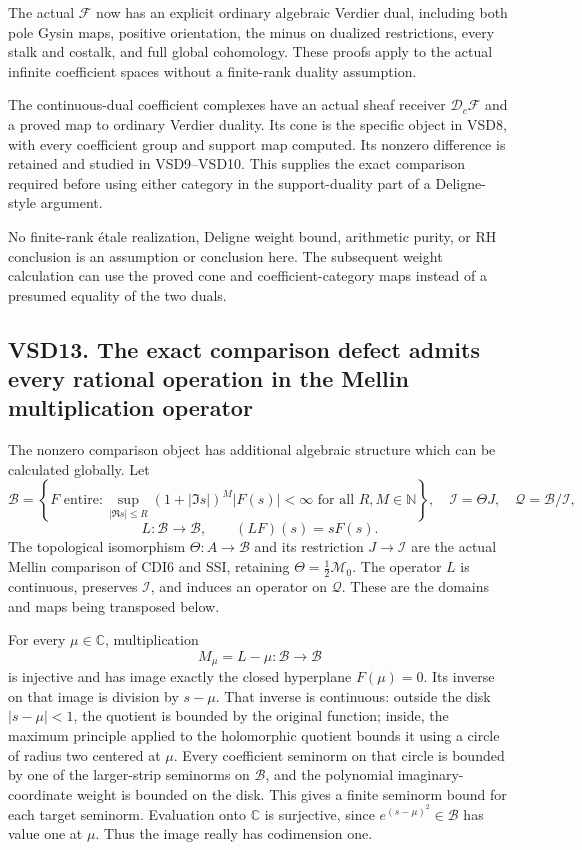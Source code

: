 The actual \(\mathscr F\) now has an explicit ordinary algebraic Verdier
dual, including both pole Gysin maps, positive orientation, the minus on
dualized restrictions, every stalk and costalk, and full global
cohomology. These proofs apply to the actual infinite coefficient spaces
without a finite-rank duality assumption.

The continuous-dual coefficient complexes have an actual sheaf receiver
\(\mathscr D_c\mathscr F\) and a proved map to ordinary Verdier duality.
Its cone is the specific object in VSD8, with every coefficient group
and support map computed. Its nonzero difference is retained and studied
in VSD9--VSD10. This supplies the exact comparison required before using
either category in the support-duality part of a Deligne-style argument.

No finite-rank étale realization, Deligne weight bound, arithmetic
purity, or RH conclusion is an assumption or conclusion here. The
subsequent weight calculation can use the proved cone and
coefficient-category maps instead of a presumed equality of the two
duals.

\subsection{VSD13. The exact comparison defect admits every rational
operation in the Mellin multiplication
operator}\label{vsd13.-the-exact-comparison-defect-admits-every-rational-operation-in-the-mellin-multiplication-operator}

The nonzero comparison object has additional algebraic structure which
can be calculated globally. Let \[
\mathcal B=\left\{F\text{ entire}:
\sup_{|\Re s|\le R}(1+|\Im s|)^M|F(s)|<\infty
\text{ for all }R,M\in\mathbb N\right\},
\quad
\mathcal I=\Theta J,\quad\mathcal Q=\mathcal B/\mathcal I,
\] \[
L:\mathcal B\to\mathcal B,\qquad (LF)(s)=sF(s).
\tag{VSD13.1}
\] The topological isomorphism \(\Theta:A\to\mathcal B\) and its
restriction \(J\to\mathcal I\) are the actual Mellin comparison of CDI6
and SSI, retaining \(\Theta=\tfrac12\mathcal M_0\). The operator \(L\)
is continuous, preserves \(\mathcal I\), and induces an operator on
\(\mathcal Q\). These are the domains and maps being transposed below.

For every \(\mu\in\mathbb C\), multiplication \[
M_\mu=L-\mu:\mathcal B\longrightarrow\mathcal B
\tag{VSD13.2}
\] is injective and has image exactly the closed hyperplane
\(F(\mu)=0\). Its inverse on that image is division by \(s-\mu\). That
inverse is continuous: outside the disk \(|s-\mu|<1\), the quotient is
bounded by the original function; inside, the maximum principle applied
to the holomorphic quotient bounds it using a circle of radius two
centered at \(\mu\). Every coefficient seminorm on that circle is
bounded by one of the larger-strip seminorms on \(\mathcal B\), and the
polynomial imaginary-coordinate weight is bounded on the disk. This
gives a finite seminorm bound for each target seminorm. Evaluation onto
\(\mathbb C\) is surjective, since \(e^{(s-\mu)^2}\in\mathcal B\) has
value one at \(\mu\). Thus the image really has codimension one.

